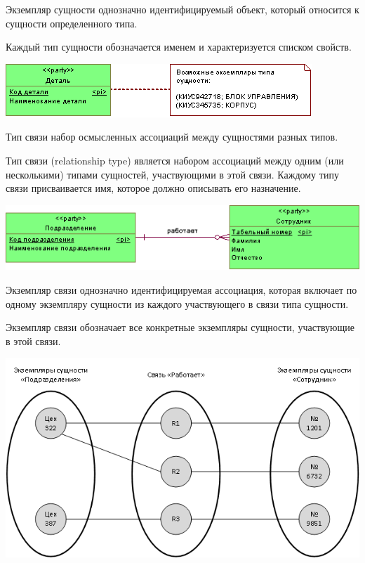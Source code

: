 \documentclass{beamer}
\begin{document}
\begin{frame}
\begin{block}{Экземпляр сущности}
однозначно идентифицируемый объект, который относится к сущности определенного типа.
\end{block}
Каждый тип сущности обозначается именем и характеризуется списком свойств. 
\begin{center}
\includegraphics[scale=1.0]{images/entity-type.png}
\end{center}
\end{frame}

\begin{frame}
\begin{block}{Тип связи}
набор осмысленных ассоциаций между сущностями разных типов.
\end{block}
Тип связи (relationship type) является набором ассоциаций между одним (или
несколькими) типами сущностей, участвующими в этой связи. Каждому типу связи присваивается имя, которое должно описывать его назначение. 
\begin{center}
\includegraphics[scale=0.8]{images/relation-01.png}
\end{center}
\end{frame}

\begin{frame}
\begin{block}{Экземпляр связи}
однозначно идентифицируемая ассоциация, которая включает по одному экземпляру сущности из каждого участвующего в связи типа сущности.
\end{block}
Экземпляр связи обозначает все конкретные экземпляры сущности, участвующие в этой связи.
\begin{center}
\includegraphics[scale=0.5]{images/relation-02.png}
\end{center}
\end{frame}
\end{document}
